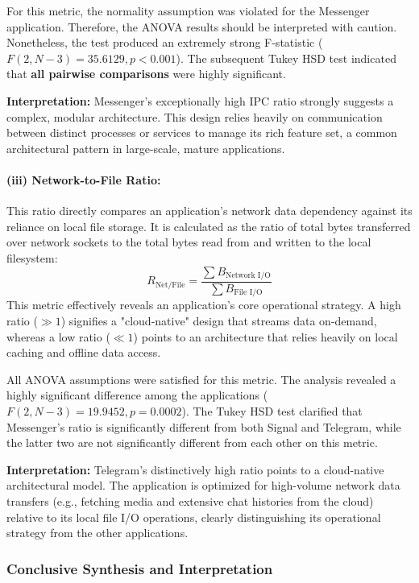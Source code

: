 \documentclass[a4paper,12pt]{report}
\begin{document}
For this metric, the normality assumption was violated for the Messenger application. Therefore, the ANOVA results should be interpreted with caution. Nonetheless, the test produced an extremely strong F-statistic ($F(2, N-3) = 35.6129, p < 0.001$). The subsequent Tukey HSD test indicated that \textbf{all pairwise comparisons} were highly significant.

\textbf{Interpretation:} Messenger's exceptionally high IPC ratio strongly suggests a complex, modular architecture. This design relies heavily on communication between distinct processes or services to manage its rich feature set, a common architectural pattern in large-scale, mature applications.

\paragraph{(iii) Network-to-File Ratio:}
This ratio directly compares an application's network data dependency against its reliance on local file storage. It is calculated as the ratio of total bytes transferred over network sockets to the total bytes read from and written to the local filesystem:
$$R_{\text{Net/File}} = \frac{\sum B_{\text{Network I/O}}}{\sum B_{\text{File I/O}}}$$
This metric effectively reveals an application's core operational strategy. A high ratio ($\gg 1$) signifies a "cloud-native" design that streams data on-demand, whereas a low ratio ($\ll 1$) points to an architecture that relies heavily on local caching and offline data access.

All ANOVA assumptions were satisfied for this metric. The analysis revealed a highly significant difference among the applications ($F(2, N-3) = 19.9452, p = 0.0002$). The Tukey HSD test clarified that Messenger's ratio is significantly different from both Signal and Telegram, while the latter two are not significantly different from each other on this metric.

\textbf{Interpretation:} Telegram's distinctively high ratio points to a cloud-native architectural model. The application is optimized for high-volume network data transfers (e.g., fetching media and extensive chat histories from the cloud) relative to its local file I/O operations, clearly distinguishing its operational strategy from the other applications.

\subsubsection{Conclusive Synthesis and Interpretation}
\end{document}
